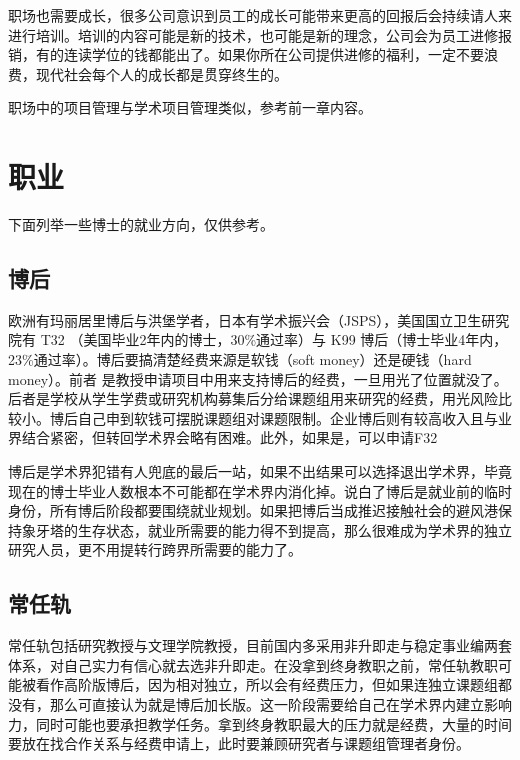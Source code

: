 \documentclass[]{tufte-book}
\begin{document}
职场也需要成长，很多公司意识到员工的成长可能带来更高的回报后会持续请人来进行培训。培训的内容可能是新的技术，也可能是新的理念，公司会为员工进修报销，有的连读学位的钱都能出了。如果你所在公司提供进修的福利，一定不要浪费，现代社会每个人的成长都是贯穿终生的。

职场中的项目管理与学术项目管理类似，参考前一章内容。

\hypertarget{ux804cux4e1a}{%
\section{职业}\label{ux804cux4e1a}}

下面列举一些博士的就业方向，仅供参考。

\hypertarget{ux535aux540e}{%
\subsection{博后}\label{ux535aux540e}}

欧洲有玛丽居里博后与洪堡学者，日本有学术振兴会（JSPS），美国国立卫生研究院有 T32 （美国毕业2年内的博士，30\%通过率）与 K99 博后（博士毕业4年内，23\%通过率）。博后要搞清楚经费来源是软钱（soft money）还是硬钱（hard money）。前者 是教授申请项目中用来支持博后的经费，一旦用光了位置就没了。后者是学校从学生学费或研究机构募集后分给课题组用来研究的经费，用光风险比较小。博后自己申到软钱可摆脱课题组对课题限制。企业博后则有较高收入且与业界结合紧密，但转回学术界会略有困难。此外，如果是，可以申请F32

博后是学术界犯错有人兜底的最后一站，如果不出结果可以选择退出学术界，毕竟现在的博士毕业人数根本不可能都在学术界内消化掉。说白了博后是就业前的临时身份，所有博后阶段都要围绕就业规划。如果把博后当成推迟接触社会的避风港保持象牙塔的生存状态，就业所需要的能力得不到提高，那么很难成为学术界的独立研究人员，更不用提转行跨界所需要的能力了。

\hypertarget{ux5e38ux4efbux8f68}{%
\subsection{常任轨}\label{ux5e38ux4efbux8f68}}

常任轨包括研究教授与文理学院教授，目前国内多采用非升即走与稳定事业编两套体系，对自己实力有信心就去选非升即走。在没拿到终身教职之前，常任轨教职可能被看作高阶版博后，因为相对独立，所以会有经费压力，但如果连独立课题组都没有，那么可直接认为就是博后加长版。这一阶段需要给自己在学术界内建立影响力，同时可能也要承担教学任务。拿到终身教职最大的压力就是经费，大量的时间要放在找合作关系与经费申请上，此时要兼顾研究者与课题组管理者身份。
\end{document}
